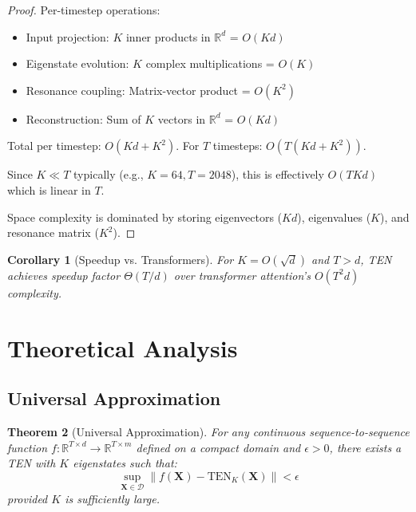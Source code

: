\documentclass[11pt,letterpaper]{article}
\newtheorem{theorem}{Theorem}
\newtheorem{corollary}[theorem]{Corollary}
\newcommand{\R}{\mathbb{R}}
\newcommand{\norm}[1]{\left\|#1\right\|}
\begin{document}
\begin{proof}
Per-timestep operations:
\begin{itemize}
    \item Input projection: $K$ inner products in $\R^d$ = $O(Kd)$
    \item Eigenstate evolution: $K$ complex multiplications = $O(K)$
    \item Resonance coupling: Matrix-vector product = $O(K^2)$
    \item Reconstruction: Sum of $K$ vectors in $\R^d$ = $O(Kd)$
\end{itemize}
Total per timestep: $O(Kd + K^2)$. For $T$ timesteps: $O(T(Kd + K^2))$.

Since $K \ll T$ typically (e.g., $K=64, T=2048$), this is effectively $O(TKd)$ which is linear in $T$.

Space complexity is dominated by storing eigenvectors ($Kd$), eigenvalues ($K$), and resonance matrix ($K^2$).
\end{proof}

\begin{corollary}[Speedup vs. Transformers]
For $K = O(\sqrt{d})$ and $T > d$, TEN achieves speedup factor $\Theta(T/d)$ over transformer attention's $O(T^2 d)$ complexity.
\end{corollary}

\section{Theoretical Analysis}
\label{sec:theory}

\subsection{Universal Approximation}

\begin{theorem}[Universal Approximation]
\label{thm:universal}
For any continuous sequence-to-sequence function $f: \R^{T \times d} \to \R^{T \times m}$ defined on a compact domain and $\epsilon > 0$, there exists a TEN with $K$ eigenstates such that:
\begin{equation}
    \sup_{\mathbf{X} \in \mathcal{D}} \norm{f(\mathbf{X}) - \text{TEN}_K(\mathbf{X})} < \epsilon
\end{equation}
provided $K$ is sufficiently large.
\end{theorem}
\end{document}
